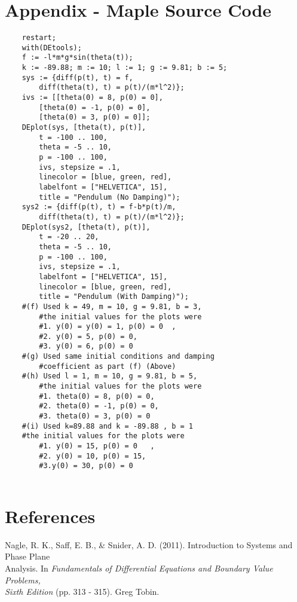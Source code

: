\documentclass[12pt]{article}
\begin{document}
	\section{Appendix - Maple Source Code}
	\begin{lstlisting}
	restart;
	with(DEtools);
	f := -l*m*g*sin(theta(t));
	k := -89.88; m := 10; l := 1; g := 9.81; b := 5;
	sys := {diff(p(t), t) = f, 
		diff(theta(t), t) = p(t)/(m*l^2)};
	ivs := [[theta(0) = 8, p(0) = 0], 
		[theta(0) = -1, p(0) = 0], 
		[theta(0) = 3, p(0) = 0]];
	DEplot(sys, [theta(t), p(t)], 
		t = -100 .. 100, 
		theta = -5 .. 10, 
		p = -100 .. 100, 
		ivs, stepsize = .1, 
		linecolor = [blue, green, red], 
		labelfont = ["HELVETICA", 15], 
		title = "Pendulum (No Damping)");
	sys2 := {diff(p(t), t) = f-b*p(t)/m, 
		diff(theta(t), t) = p(t)/(m*l^2)};
	DEplot(sys2, [theta(t), p(t)], 
		t = -20 .. 20, 
		theta = -5 .. 10, 
		p = -100 .. 100, 
		ivs, stepsize = .1, 
		labelfont = ["HELVETICA", 15], 
		linecolor = [blue, green, red], 
		title = "Pendulum (With Damping)");
	#(f) Used k = 49, m = 10, g = 9.81, b = 3,
		#the initial values for the plots were 
		#1. y(0) = y(0) = 1, p(0) = 0  , 
		#2. y(0) = 5, p(0) = 0, 
		#3. y(0) = 6, p(0) = 0
	#(g) Used same initial conditions and damping 
		#coefficient as part (f) (Above)
	#(h) Used l = 1, m = 10, g = 9.81, b = 5,
		#the initial values for the plots were  
		#1. theta(0) = 8, p(0) = 0, 
		#2. theta(0) = -1, p(0) = 0, 
		#3. theta(0) = 3, p(0) = 0
	#(i) Used k=89.88 and k = -89.88 , b = 1
	#the initial values for the plots were 
		#1. y(0) = 15, p(0) = 0   , 
		#2. y(0) = 10, p(0) = 15, 
		#3.y(0) = 30, p(0) = 0
	
	\end{lstlisting}
	\clearpage
	\section{References}
	
	Nagle, R. K., Saff, E. B., \& Snider, A. D. (2011). 
		Introduction to Systems and Phase Plane 
		\\ \indent Analysis. In \textit{Fundamentals of Differential Equations and 
		Boundary Value Problems,}
		\\ \indent \textit{ Sixth Edition} (pp. 313 - 315). Greg Tobin.	
	
\end{document}

